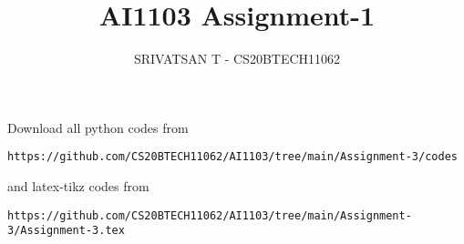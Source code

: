 \documentclass[journal,12pt,twocolumn]{IEEEtran}
\DeclareMathOperator*{\Res}{Res}
\begin{document}
\newcommand{\BEQA}{\begin{eqnarray}}
        \newcommand{\EEQA}{\end{eqnarray}}
\newcommand{\define}{\stackrel{\triangle}{=}}

\raggedbottom
\setlength{\parindent}{0pt}
\providecommand{\mbf}{\mathbf}
\providecommand{\pr}[1]{\ensuremath{\Pr\left(#1\right)}}
\providecommand{\qfunc}[1]{\ensuremath{Q\left(#1\right)}}
\providecommand{\sbrak}[1]{\ensuremath{{}\left[#1\right]}}
\providecommand{\lsbrak}[1]{\ensuremath{{}\left[#1\right.}}
\providecommand{\rsbrak}[1]{\ensuremath{{}\left.#1\right]}}
\providecommand{\brak}[1]{\ensuremath{\left(#1\right)}}
\providecommand{\lbrak}[1]{\ensuremath{\left(#1\right.}}
\providecommand{\rbrak}[1]{\ensuremath{\left.#1\right)}}
\providecommand{\cbrak}[1]{\ensuremath{\left\{#1\right\}}}
\providecommand{\lcbrak}[1]{\ensuremath{\left\{#1\right.}}
\providecommand{\rcbrak}[1]{\ensuremath{\left.#1\right\}}}
\theoremstyle{remark}
\newtheorem{rem}{Remark}
\newcommand{\sgn}{\mathop{\mathrm{sgn}}}
\providecommand{\abs}[1]{\vert#1\vert}
\providecommand{\res}[1]{\Res\displaylimits_{#1}}
\providecommand{\norm}[1]{\lVert#1\rVert}
\providecommand{\mtx}[1]{\mathbf{#1}}
\providecommand{\mean}[1]{E[#1]}
\providecommand{\fourier}{\overset{\mathcal{F}}{ \rightleftharpoons}}
\providecommand{\system}{\overset{\mathcal{H}}{ \longleftrightarrow}}
\newcommand{\solution}{\noindent \textbf{Solution: }}
\newcommand{\cosec}{\,\text{cosec}\,}
\providecommand{\dec}[2]{\ensuremath{\overset{#1}{\underset{#2}{\gtrless}}}}
\newcommand{\myvec}[1]{\ensuremath{\begin{pmatrix}#1\end{pmatrix}}}
\newcommand{\mydet}[1]{\ensuremath{\begin{vmatrix}#1\end{vmatrix}}}
\makeatletter
{}
\makeatother
\let\StandardTheFigure\thefigure
\let\vec\mathbf
\renewcommand{\thefigure}{\theproblem}
\def\putbox#1#2#3{\makebox[0in][l]{\makebox[#1][l]{}\raisebox{\baselineskip}[0in][0in]{\raisebox{#2}[0in][0in]{#3}}}}
\def\rightbox#1{\makebox[0in][r]{#1}}
\def\centbox#1{\makebox[0in]{#1}}
\def\topbox#1{\raisebox{-\baselineskip}[0in][0in]{#1}}
\def\midbox#1{\raisebox{-0.5\baselineskip}[0in][0in]{#1}}
\vspace{3cm}
\title{AI1103 Assignment-1}
\author{SRIVATSAN T - CS20BTECH11062}
\maketitle
\newpage
\bigskip
\renewcommand{\thefigure}{\theenumi}
\renewcommand{\thetable}{\theenumi}
Download all python codes from
\begin{lstlisting}
https://github.com/CS20BTECH11062/AI1103/tree/main/Assignment-3/codes
\end{lstlisting}
%
and latex-tikz codes from
%
\begin{lstlisting}
https://github.com/CS20BTECH11062/AI1103/tree/main/Assignment-3/Assignment-3.tex
\end{lstlisting}
\end{document}

